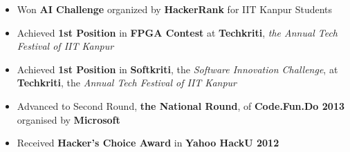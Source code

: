 \documentclass[9pt]{article}
\newenvironment{changemargin}[2]{%
  \begin{list}{}{%
    \setlength{\topsep}{0pt}%
    \setlength{\leftmargin}{#1}%
    \setlength{\rightmargin}{#2}%
    \setlength{\listparindent}{\parindent}%
    \setlength{\itemindent}{\parindent}%
    \setlength{\parsep}{\parskip}%
  }%
  \item[]}{\end{list}
}
\newenvironment{body} {
	\vspace*{-16pt}
	\begin{changemargin}{-0.6in}{-0.65in}
  }	
	{\end{changemargin}
}
\begin{document}
\begin{body}
	\vspace{14pt}
	\begin{itemize}
		\item{Won \textbf{AI Challenge} organized by \textbf{HackerRank} for IIT Kanpur Students}
		\item{Achieved \textbf{1st Position} in \textbf{FPGA Contest} at \textbf{Techkriti}, \emph{the Annual Tech Festival of IIT Kanpur}}
		\item{Achieved \textbf{1st Position} in \textbf{Softkriti}, the \emph{Software Innovation Challenge}, at \textbf{Techkriti}, the \emph{Annual Tech Festival of IIT Kanpur}}
		\item{Advanced to Second Round, \textbf{the National Round}, of \textbf{Code.Fun.Do 2013} organised by \textbf{Microsoft}}
		\item{Received \textbf{Hacker's Choice Award} in \textbf{Yahoo HackU 2012}}
	\end{itemize}
\end{body}
\end{document}

